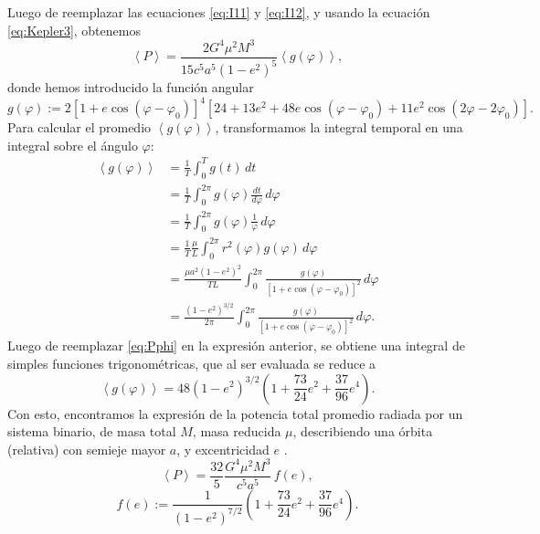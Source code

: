 Luego de reemplazar las ecuaciones \ref{eq:I11} y \ref{eq:I12}, y usando la ecuación \ref{eq:Kepler3}, obtenemos
\begin{equation*}
\left\langle P\right\rangle = \frac{2G^4\mu^2M^3}{15c^5a^5\left(1-e^2\right)^{5}}\left\langle g(\varphi)\right\rangle ,
\end{equation*}
donde hemos introducido la función angular
\begin{equation}\label{eq:Pphi}
g(\varphi):=2\left[1+e\cos(\varphi-\varphi_0)\right]^4
\left[24+13e^2+48e\cos(\varphi-\varphi_0) +11e^2\cos(2\varphi-2\varphi_0)\right].
\end{equation}
Para calcular el promedio $\left\langle g(\varphi)\right\rangle$, transformamos la integral temporal en una integral sobre el ángulo $\varphi$:
\begin{align*}
\left\langle g(\varphi)\right\rangle &= \frac{1}{T}\int_0^T g(t)\,dt \\
&= \frac{1}{T}\int_0^{2\pi} g(\varphi)\frac{dt}{d\varphi}\,d\varphi \\
&= \frac{1}{T}\int_0^{2\pi} g(\varphi)\frac{1}{\dot{\varphi}}\,d\varphi \\
&= \frac{1}{T}\frac{\mu}{L}\int_0^{2\pi} r^2(\varphi)g(\varphi)\,d\varphi \\
&= \frac{\mu a^2(1-e^2)^2}{TL}\int_0^{2\pi} \frac{g(\varphi)}{\left[1+e\cos(\varphi-\varphi_0)\right]^2}\,d\varphi \\
&= \frac{(1-e^2)^{3/2}}{2\pi}\int_0^{2\pi} \frac{g(\varphi)}{\left[1+e\cos(\varphi-\varphi_0)\right]^2}\,d\varphi.
\end{align*}
Luego de reemplazar \ref{eq:Pphi} en la expresión anterior, se obtiene una integral de simples funciones trigonométricas, que al ser evaluada se reduce a
\begin{equation*}
\left\langle g(\varphi)\right\rangle= 48(1-e^2)^{3/2}\left(1+\frac{73}{24}e^2+\frac{37}{96}e^4\right).
\end{equation*}
Con esto, encontramos la expresión de la potencia total promedio radiada por un sistema binario, de masa total $M$, masa reducida $\mu$, describiendo una órbita (relativa) con semieje mayor $a$, y excentricidad $e$ \cite{PhysRev.131.435}.
\begin{equation}\label{eq:PSbin}
\left\langle P\right\rangle =\frac{32}{5}\frac{G^4\mu^2M^3}{c^5a^5}\,f(e),
\end{equation}
\begin{equation*}
f(e):=\frac{1}{\left(1-e^2\right)^{7/2}}\left(1+\frac{73}{24}e^2+\frac{37}{96}e^4\right).
\end{equation*}
